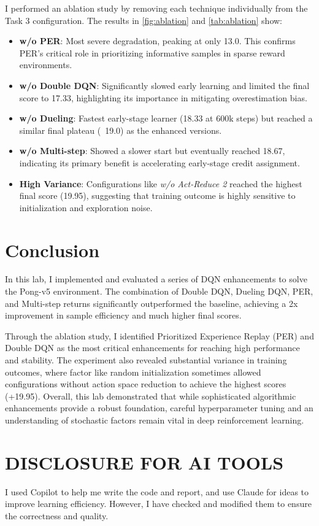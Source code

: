 \documentclass[10pt,twocolumn,letterpaper]{article}
\begin{document}
I performed an ablation study by removing each technique individually from the
Task 3 configuration. The results in \cref{fig:ablation} and \cref{tab:ablation}
show:
\begin{itemize}[itemsep=0pt]
  \item \textbf{w/o PER}: Most severe degradation, peaking at only 13.0. This confirms PER's critical role in prioritizing informative samples in sparse reward environments.
  \item \textbf{w/o Double DQN}: Significantly slowed early learning and limited the final score to 17.33, highlighting its importance in mitigating overestimation bias.
  \item \textbf{w/o Dueling}: Fastest early-stage learner (18.33 at 600k steps) but reached a similar final plateau (~19.0) as the enhanced versions.
  \item \textbf{w/o Multi-step}: Showed a slower start but eventually reached 18.67, indicating its primary benefit is accelerating early-stage credit assignment.
  \item \textbf{High Variance}: Configurations like \textit{w/o Act-Reduce 2} reached the highest final score (19.95), suggesting that training outcome is highly sensitive to initialization and exploration noise.
\end{itemize}

\section{Conclusion}

In this lab, I implemented and evaluated a series of DQN enhancements to solve the Pong-v5 environment. The combination of Double DQN, Dueling DQN, PER, and Multi-step returns significantly outperformed the baseline, achieving a 2x improvement in sample efficiency and much higher final scores.

Through the ablation study, I identified Prioritized Experience Replay (PER) and Double DQN as the most critical enhancements for reaching high performance and stability. The experiment also revealed substantial variance in training outcomes, where factor like random initialization sometimes allowed configurations without action space reduction to achieve the highest scores (+19.95). Overall, this lab demonstrated that while sophisticated algorithmic enhancements provide a robust foundation, careful hyperparameter tuning and an understanding of stochastic factors remain vital in deep reinforcement learning.

\section*{DISCLOSURE FOR AI TOOLS}

I used Copilot to help me write the code and report, and use Claude for ideas to
improve learning efficiency. However, I have checked and modified them to ensure
the correctness and quality.

% 
% 
\end{document}
